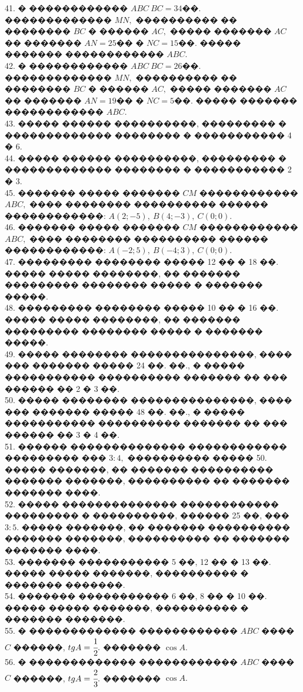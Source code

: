 \documentclass[12pt]{article}
\begin{document}
41. � ������������ $ABC\ BC=34$��. ������������� $MN,$ ���������� �� �������� $BC$ � ������ $AC,$ ����� ������� $AC$ �� ������� $AN=25$�� � $NC=15$��. ����� ������� ������������ $ABC.$\\
42. � ������������ $ABC\ BC=26$��. ������������� $MN,$ ���������� �� �������� $BC$ � ������ $AC,$ ����� ������� $AC$ �� ������� $AN=19$�� � $NC=5$��. ����� ������� ������������ $ABC.$\\
43. ����� ������ ����������, ��������� � ������������� �������� � ����������� 4 � 6.\\
44. ����� ������ ����������, ��������� � ������������� �������� � ����������� 2 � 3.\\
45. ������� ����� ������� $CM$ ������������ $ABC,$ ���� �������� ���������� ������ ������������: $A(2;-5),\ B(4;-3),\ C(0;0).$\\
46. ������� ����� ������� $CM$ ������������ $ABC,$ ���� �������� ���������� ������ ������������: $A(-2;5),\ B(-4;3),\ C(0;0).$\\
47. ��������� �������� ����� 12 �� � 18 ��. ����� ����� ��������, �� ������� ��������� �������� ����� � ������� �����.\\
48. ��������� �������� ����� 10 �� � 16 ��. ����� ����� ��������, �� ������� ��������� �������� ����� � ������� �����.\\
49. ����� �������� ���������������, ���� ��� ������� ����� 24 ��. ��., � ����� ����������� ���������� ������� �� ��� ������ �� 2 � 3 ��.\\
50. ����� �������� ���������������, ���� ��� ������� ����� 48 ��. ��., � ����� ����������� ���������� ������� �� ��� ������ �� 3 � 4 ��.\\
51. ������ �������������� ������������ ��������� ��� $3:4,$ ���������� ����� 50. ����� �������, �� ������� ���������� ������� �������, ���������� �� ������� ������� ����.\\
52. ����� �������������� ������������ ��������� � ����������, ������ 25 ��, ��� $3:5.$ ����� �������, �� ������� ���������� ������� �������, ���������� �� ������� ������� ����.\\
53. ������� ����������� 5 ��, 12 �� � 13 ��. ����� ����� �������, ���������� � ������� �������.\\
54. ������� ����������� 6 ��, 8 �� � 10 ��. ����� ����� �������, ���������� � ������� �������.\\
55. � ������������� ������������ $ABC$ ���� $C$ ������, $tg A=\cfrac{1}{2}.$ ������� $\cos A.$\\
56. � ������������� ������������ $ABC$ ���� $C$ ������, $tg A=\cfrac{2}{3}.$ ������� $\cos A.$\\
\end{document}
